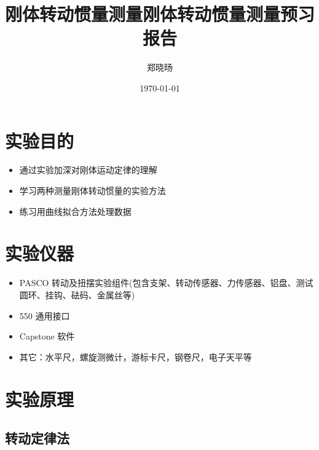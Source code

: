 \documentclass[UTF8]{ctexart}
\title{刚体转动惯量测量}
\title{刚体转动惯量测量预习报告}
\author{郑晓旸}
\date{\today}
\begin{document}
\fancyfoot[C]{\thepage}

\maketitle
\tableofcontents
\newpage

\section{实验目的}
    \begin{itemize}
        \item 通过实验加深对刚体运动定律的理解
        \item 学习两种测量刚体转动惯量的实验方法
        \item 练习用曲线拟合方法处理数据
    \end{itemize}

\section{实验仪器}
\begin{itemize}
    \item PASCO 转动及扭摆实验组件(包含支架、转动传感器、力传感器、铝盘、测试圆环、挂钩、砝码、金属丝等)
    \item 550 通用接口
    \item Capstone 软件
    \item 其它：水平尺，螺旋测微计，游标卡尺，钢卷尺，电子天平等
\end{itemize}

\section{实验原理}

    \subsection{转动定律法}
    
\end{document}
